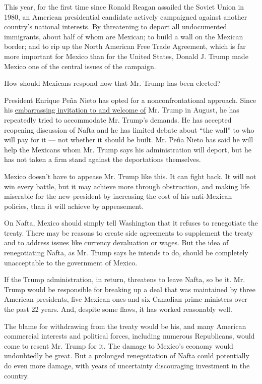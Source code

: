 This year, for the first time since Ronald Reagan assailed the Soviet
Union in 1980, an American presidential candidate actively campaigned
against another country's national interests. By threatening to deport
all undocumented immigrants, about half of whom are Mexican; to build a
wall on the Mexican border; and to rip up the North American Free Trade
Agreement, which is far more important for Mexico than for the United
States, Donald J. Trump made Mexico one of the central issues of the
campaign.

How should Mexicans respond now that Mr. Trump has been elected?

President Enrique Peña Nieto has opted for a nonconfrontational
approach. Since his
\href{http://www.nytimes.com/2016/09/02/opinion/why-did-pena-nieto-invite-trump-to-mexico.html}{embarrassing
invitation to and welcome of} Mr. Trump in August, he has repeatedly
tried to accommodate Mr. Trump's demands. He has accepted reopening
discussion of Nafta and he has limited debate about ``the wall'' to who
will pay for it --- not whether it should be built. Mr. Peña Nieto has
said he will help the Mexicans whom Mr. Trump says his administration
will deport, but he has not taken a firm stand against the deportations
themselves.

Mexico doesn't have to appease Mr. Trump like this. It can fight back.
It will not win every battle, but it may achieve more through
obstruction, and making life miserable for the new president by
increasing the cost of his anti-Mexican policies, than it will achieve
by appeasement.

On Nafta, Mexico should simply tell Washington that it refuses to
renegotiate the treaty. There may be reasons to create side agreements
to supplement the treaty and to address issues like currency devaluation
or wages. But the idea of renegotiating Nafta, as Mr. Trump says he
intends to do, should be completely unacceptable to the government of
Mexico.

If the Trump administration, in return, threatens to leave Nafta, so be
it. Mr. Trump would be responsible for breaking up a deal that was
maintained by three American presidents, five Mexican ones and six
Canadian prime ministers over the past 22 years. And, despite some
flaws, it has worked reasonably well.

The blame for withdrawing from the treaty would be his, and many
American commercial interests and political forces, including numerous
Republicans, would come to resent Mr. Trump for it. The damage to
Mexico's economy would undoubtedly be great. But a prolonged
renegotiation of Nafta could potentially do even more damage, with years
of uncertainty discouraging investment in the country.

